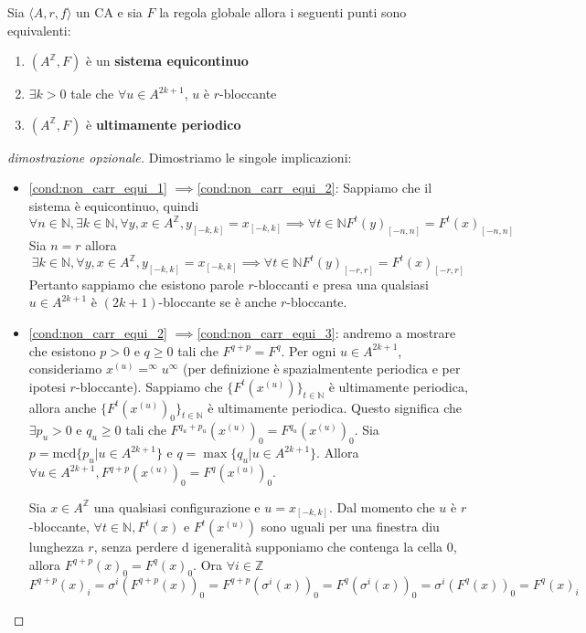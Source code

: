 \begin{teorema}
    Sia $\langle A,r,f\rangle$ un CA e sia $F$ la regola globale allora i seguenti
    punti sono equivalenti:
    \begin{enumerate}
        \item \label{cond:non_carr_equi_1} $(A^\mathbb{Z}, F)$ è un \textbf{sistema equicontinuo}
        \item \label{cond:non_carr_equi_2} $\exists k>0$ tale che $\forall u \in A^{2k+1}$, $u$ è $r$-bloccante
        \item \label{cond:non_carr_equi_3} $(A^\mathbb{Z}, F)$ è \textbf{ultimamente periodico}
    \end{enumerate}
    \begin{proof}[dimostrazione opzionale]
        Dimostriamo le singole implicazioni:
        \begin{itemize}
            \item \ref{cond:non_carr_equi_1} $\implies $\ref{cond:non_carr_equi_2}:
            Sappiamo che il sistema è equicontinuo, quindi
            $$\forall n\in \mathbb{N} ,\exists k\in \mathbb{N} , \forall y,x\in A^\mathbb{Z}, y_{[-k,k]} = x_{[-k,k]} \implies \forall t\in \mathbb{N} F^t(y)_{[-n,n]}=F^t(x)_{[-n,n]}$$
            Sia $n=r$ allora 
            $$\exists k\in \mathbb{N} , \forall y,x\in A^\mathbb{Z}, y_{[-k,k]} = x_{[-k,k]} \implies \forall t\in \mathbb{N} F^t(y)_{[-r,r]}=F^t(x)_{[-r,r]}$$
            Pertanto sappiamo che esistono parole $r$-bloccanti e presa una qualsiasi $u\in A^{2k+1}$ è $(2k+1)$-bloccante se è anche $r$-bloccante.
            \item \ref{cond:non_carr_equi_2} $\implies $\ref{cond:non_carr_equi_3}: 
            andremo a mostrare che esistono $p>0$ e $q\ge 0$ tali che $F^{q+p} = F^q$.
            Per ogni $u\in A^{2k+1}$, consideriamo $x^{(u)}=^\infty u^\infty$ (per 
            definizione è spazialmentente periodica e per ipotesi $r$-bloccante).
            Sappiamo che $\{F^t(x^{(u)})\}_{t\in \mathbb{N}}$ è ultimamente periodica,
            allora  anche $\{F^t(x^{(u)})_0\}_{t\in \mathbb{N}}$ è ultimamente periodica.
            Questo significa che $\exists p_u>0$ e $q_u\ge 0$ tali che $F^{q_u+p_u}(x^{(u)})_0 =F^{q_u}(x^{(u)})_0 $.
            Sia $p=\text{mcd}\{p_u|u\in A^{2k+1}\}$ e $q=\max\{q_u|u\in A^{2k+1}\}$.
            Allora $\forall u\in A^{2k+1}, F^{q+p}(x^{(u)})_0 = F^{q}(x^{(u)})_0$.

            Sia $x\in A^\mathbb{Z}$ una qualsiasi configurazione e $u=x_{[-k,k]}$.
            Dal momento che $u$ è $r$-bloccante, $\forall t\in \mathbb{N}, F^t(x)$
             e $ F^t(x^{(u)})$ sono uguali per una finestra diu lunghezza $r$, 
             senza perdere d igeneralità supponiamo che contenga la cella $0$, allora 
             $F^{q+p}(x)_0 = F^{q}(x)_0$. Ora $\forall i\in \mathbb{Z}$
             $$F^{q+p}(x)_i = \sigma^i(F^{q+p}(x))_0 = F^{q+p}(\sigma^i(x))_0= F^{q}(\sigma^i(x))_0 = \sigma^i(F^{q}(x))_0 = F^{q}(x)_i$$


\end{itemize}
\end{proof}
\end{teorema}
